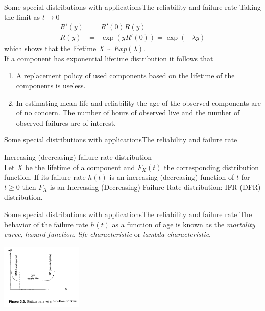 \documentclass[handout]{beamer}
\begin{document}
\begin{frame}{Some special distributions with applications}{The reliability and failure rate}
Taking the limit as $t\rightarrow0$ 
  \begin{eqnarray*}
R'(y) &=& R'(0)R(y) \\
R(y) &=& \exp(yR'(0)) = \exp(-\lambda y)
  \end{eqnarray*}
which shows that the lifetime $X \sim Exp(\lambda)$.\\
If a component has exponential lifetime distribution it follows that
\begin{enumerate}
\item A replacement policy of used components based on the lifetime of the components is useless.
\item In estimating mean life and reliability the age of the observed components are of no concern.
The number of hours of observed live and the number of observed failures are of interest. 
\end{enumerate}

\end{frame}

\begin{frame}{Some special distributions with applications}{The reliability and failure rate}
\begin{definition}
Increasing (decreasing) failure rate distribution\\
Let $X$ be the lifetime of a component and $F_X(t)$ the corresponding distribution function.
If its failure rate $h(t)$ is an increasing (decreasing) function of $t$ for $t \geq 0$ then $F_X$ is an Increasing (Decreasing) Failure 
Rate distribution: IFR (DFR) distribution.
\end{definition}

\end{frame}
\begin{frame}{Some special distributions with applications}{The reliability and failure rate}
 The behavior of the failure rate $h(t)$ as a function of age is known as the \textit{mortality curve}, 
\textit{hazard function}, \textit{life characteristic} or \textit{lambda characteristic}.
\begin{center}
 \includegraphics[width=110pt,keepaspectratio=true]{./Figura3_6.png}
\end{center}

\end{frame}
\end{document}
